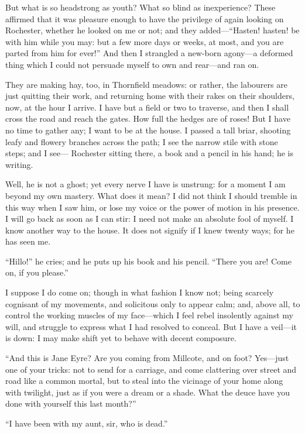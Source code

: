But what is so headstrong as youth? What so blind as inexperience? 
These affirmed that it was pleasure enough to have the privilege of
again looking on \Mr{} Rochester, whether he looked on me or not; and they
added---\enquote{Hasten! hasten! be with him while you may: but a few
more days or weeks, at most, and you are parted from him for ever!} And
then I strangled a new-born agony---a deformed thing which I could not
persuade myself to own and rear---and ran on.

They are making hay, too, in Thornfield meadows: or rather, the
labourers are just quitting their work, and returning home with their
rakes on their shoulders, now, at the hour I arrive. I have but a field
or two to traverse, and then I shall cross the road and reach the
gates. How full the hedges are of roses! But I have no time to gather
any; I want to be at the house. I passed a tall briar, shooting leafy
and flowery branches across the path; I see the narrow stile with stone
steps; and I see---\Mr{} Rochester sitting there, a book and a pencil in
his hand; he is writing.

Well, he is not a ghost; yet every nerve I have is unstrung: for a
moment I am beyond my own mastery. What does it mean? I did not think
I should tremble in this way when I saw him, or lose my voice or the
power of motion in his presence. I will go back as soon as I can stir:
I need not make an absolute fool of myself. I know another way to the
house. It does not signify if I knew twenty ways; for he has seen me.

\enquote{Hillo!} he cries; and he puts up his book and his pencil. 
\enquote{There you are! Come on, if you please.}

I suppose I do come on; though in what fashion I know not; being
scarcely cognisant of my movements, and solicitous only to appear calm;
and, above all, to control the working muscles of my face---which I feel
rebel insolently against my will, and struggle to express what I had
resolved to conceal. But I have a veil---it is down: I may make shift
yet to behave with decent composure.

\enquote{And this is Jane Eyre? Are you coming from Millcote, and on
foot? Yes---just one of your tricks: not to send for a carriage, and
come clattering over street and road like a common mortal, but to steal
into the vicinage of your home along with twilight, just as if you were
a dream or a shade. What the deuce have you done with yourself this
last month?}

\enquote{I have been with my aunt, sir, who is dead.}

